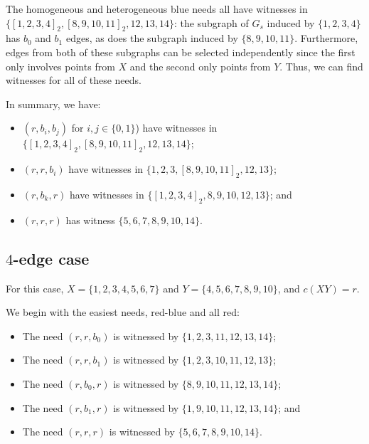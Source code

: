 \documentclass{article}
\theoremstyle{definition}
\begin{document}
The homogeneous and heterogeneous blue needs all have witnesses in
$\{[1,2,3,4]_{2}, [8,9,10,11]_{2}, 12, 13, 14\}$: the subgraph of $G_{s}$
induced by $\{1,2,3,4\}$ has $b_{0}$ and $b_{1}$ edges, as does the subgraph
induced by $\{8,9,10,11\}$. Furthermore, edges from both of these subgraphs can
be selected independently since the first only involves points from $X$ and the
second only points from $Y$. Thus, we can find witnesses for all of these
needs.

In summary, we have:
\begin{itemize}
\item $(r,b_{i},b_{j})$ for $i,j \in \{0,1\}$) have witnesses in $\{[1,2,3,4]_{2}, [8,9,10,11]_{2}, 12, 13, 14\}$;
\item $(r,r,b_{i})$ have witnesses in $\{1,2,3,[8,9,10,11]_{2},12,13\}$;
\item $(r,b_{k},r)$ have witnesses in $\{[1,2,3,4]_{2},8,9,10,12,13\}$; and
\item $(r,r,r)$ has witness $\{5,6,7,8,9,10,14\}$.
\end{itemize}

\subsection{$4$-edge case}


For this case, $X = \{1,2,3,4,5,6,7\}$ and $Y = \{4,5,6,7,8,9,10\}$, and $c(XY)
= r$.

We begin with the easiest needs, red-blue and all red:
\begin{itemize}
\item The need $(r,r,b_{0})$ is witnessed by $\{1,2,3,11,12,13,14\}$;
\item The need $(r,r,b_{1})$ is witnessed by $\{1,2,3,10,11,12,13\}$;
\item The need $(r,b_{0},r)$ is witnessed by $\{8,9,10,11,12,13,14\}$;
\item The need $(r,b_{1},r)$ is witnessed by $\{1,9,10,11,12,13,14\}$; and
\item The need $(r,r,r)$ is witnessed by $\{5,6,7,8,9,10,14\}$.
\end{itemize}
\end{document}

